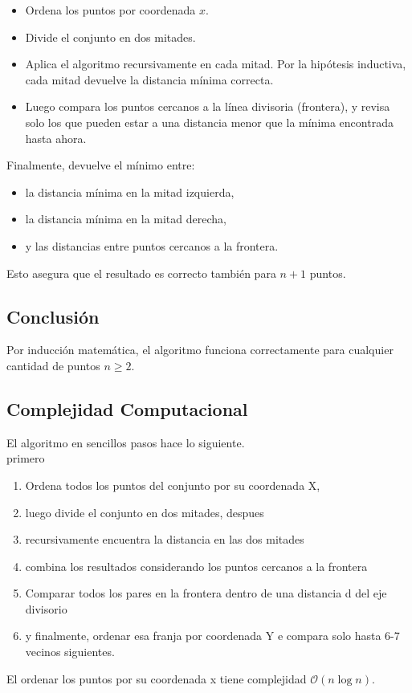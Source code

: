 \documentclass{article}
\begin{document}
\begin{itemize}
    \item Ordena los puntos por coordenada $x$.
    \item Divide el conjunto en dos mitades.
    \item Aplica el algoritmo recursivamente en cada mitad. Por la hipótesis inductiva, cada mitad devuelve la distancia mínima correcta.
    \item Luego compara los puntos cercanos a la línea divisoria (frontera), y revisa solo los que pueden estar a una distancia menor que la mínima encontrada hasta ahora.
\end{itemize}

Finalmente, devuelve el mínimo entre:

\begin{itemize}
    \item la distancia mínima en la mitad izquierda,
    \item la distancia mínima en la mitad derecha,
    \item y las distancias entre puntos cercanos a la frontera.
\end{itemize}

Esto asegura que el resultado es correcto también para $n+1$ puntos.

\subsection*{Conclusión}

Por inducción matemática, el algoritmo funciona correctamente para cualquier cantidad de puntos $n \geq 2$.

\subsection{Complejidad Computacional}
El algoritmo en sencillos pasos hace lo siguiente.\\ primero
\begin{enumerate}
    \item Ordena todos los puntos del conjunto por su coordenada X,
    \item luego divide el conjunto en dos mitades, despues
    \item recursivamente encuentra la distancia en las dos mitades
    \item combina los resultados considerando los puntos cercanos a la frontera
    \item Comparar todos los pares en la frontera dentro de una distancia d del eje divisorio
    \item y finalmente, ordenar esa franja por coordenada Y e compara solo hasta 6-7 vecinos siguientes.
\end{enumerate}
El ordenar los puntos por su coordenada x tiene complejidad $\mathcal{O}(n \log n)$.
\end{document}
